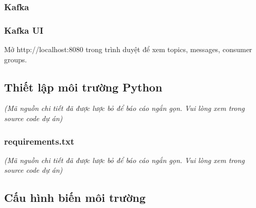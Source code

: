 \hypertarget{kafka}{%
\subsubsection{Kafka}}

\begin{Shaded}
\begin{Highlighting}[]

 
\end{Highlighting}
\end{Shaded}

\hypertarget{kafka-ui}{%
\subsubsection{Kafka UI}}

Mở http://localhost:8080 trong trình duyệt để xem topics, messages,
consumer groups.

\hypertarget{thiux1ebft-lux1eadp-muxf4i-trux1b0ux1eddng-python}{%
\subsection{Thiết lập môi trường
Python}}

\emph{(Mã nguồn chi tiết đã được lược bỏ để báo cáo ngắn gọn. Vui lòng
xem trong source code dự án)}

\hypertarget{requirements.txt}{%
\subsubsection{requirements.txt}}

\emph{(Mã nguồn chi tiết đã được lược bỏ để báo cáo ngắn gọn. Vui lòng
xem trong source code dự án)}

\hypertarget{cux1ea5u-huxecnh-biux1ebfn-muxf4i-trux1b0ux1eddng}{%
\subsection{Cấu hình biến môi
trường}}

